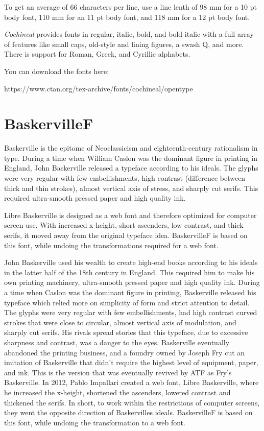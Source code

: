 To get an average of 66 characters per line, use a line lenth of 98 mm for a 10 pt body font, 110 mm for an 11 pt body font, and 118 mm for a 12 pt body font.

{\it Cochineal} provides fonts in regular, italic, bold, and bold italic with a full array of features like small caps, old-style and lining figures, a swash Q, and more. There is support for Roman, Greek, and Cyrillic alphabets.

You can download the fonts here:  

https://www.ctan.org/tex-archive/fonts/cochineal/opentype

%
%

\switchtobodyfont[baskervillef,10pt]
\chapter[baskervillef]{BaskervilleF}

Baskerville is the epitome of Neoclassicism and eighteenth-century rationalism in type. During a time when William Caslon was the dominant figure in printing in England, John Baskerville released a typeface according to his ideals. The glyphs were very regular with few embellishments, high contrast (difference between thick and thin strokes), almost vertical axis of stress, and sharply cut serifs. This required ultra-smooth pressed paper and high quality ink. 

Libre Baskerville is designed as a web font and therefore optimized for computer screen use. With increased x-height, short ascenders, low contrast, and thick serifs, it moved away from the original typeface idea. BaskervilleF is based on this font, while undoing the transformations required for a web font.

John Baskerville used his wealth to create high-end books according to his ideals in the latter half of the 18th century in England. This required him to make his own printing machinery, ultra-smooth pressed paper and high quality ink. During a time when Caslon was the dominant figure in printing, Baskerville released his typeface which relied more on simplicity of form and strict attention to detail. The glyphs were very regular with few embellishments, had high contrast curved strokes that were close to circular, almost vertical axis of modulation, and sharply cut serifs. His rivals spread stories that this typeface, due to excessive sharpness and contrast, was a danger to the eyes. Baskerville eventually abandoned the printing business, and a foundry owned by Joseph Fry cut an imitation of Baskerville that didn't require the highest level of equipment, paper, and ink. This is the version that was eventually revived by ATF as Fry's Baskerville. In 2012, Pablo Impallari created a web font, Libre Baskerville, where he increased the x-height, shortened the ascenders, lowered contrast and thickened the serifs. In short, to work within the restrictions of computer screens, they went the opposite direction of Baskervilles ideals. BaskervilleF is based on this font, while undoing the transformation to a web font.

